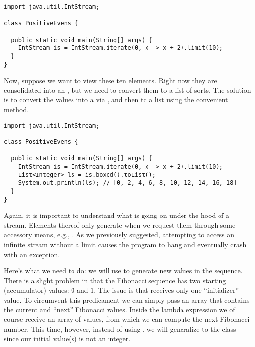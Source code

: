 \begin{cl}[]{}
\begin{lstlisting}[language=MyJava]
import java.util.IntStream;

class PositiveEvens {
  
  public static void main(String[] args) {
    IntStream is = IntStream.iterate(0, x -> x + 2).limit(10);
  }
}
\end{lstlisting}
\end{cl}
Now, suppose we want to view these ten elements. Right now they are consolidated into an , but we need to convert them to a list of sorts. The solution is to convert the values into a  via , and then to a list using the convenient  method.
\begin{cl}[]{}
\begin{lstlisting}[language=MyJava]
import java.util.IntStream;

class PositiveEvens {
  
  public static void main(String[] args) {
    IntStream is = IntStream.iterate(0, x -> x + 2).limit(10);
    List<Integer> ls = is.boxed().toList();
    System.out.println(ls); // [0, 2, 4, 6, 8, 10, 12, 14, 16, 18]
  }
}
\end{lstlisting}
\end{cl}
Again, it is important to understand what is going on under the hood of a stream. Elements thereof only generate when we request them through some accessory means, e.g., . As we previously suggested, attempting to access an infinite stream without a limit causes the program to hang and eventually crash with an  exception.


Here's what we need to do: we will use  to generate new values in the sequence. There is a slight problem in that the Fibonacci sequence has two starting (accumulator) values: $0$ and $1$. The issue is that  receives only one ``initializer'' value. To circumvent this predicament we can simply pass an array that contains the current and ``next'' Fibonacci values. Inside the lambda expression we of course receive an array of values, from which we can compute the next Fibonacci number. This time, however, instead of using , we will generalize to the  class since our initial value(s) is not an integer.

